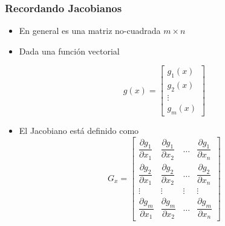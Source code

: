 \begin{frame}
    \frametitle{Recordando Jacobianos}
    
    \begin{itemize}
        \item En general es una matriz no-cuadrada $m \times n$
        \item Dada una función vectorial
        
        \begin{equation*}
            g(x) =
            \begin{bmatrix}
            g_{1}(x) \\
            g_{2}(x) \\
            \vdots \\
            g_{m}(x)
            \end{bmatrix}
        \end{equation*}
    
        \item  El Jacobiano está definido como
        \begin{equation*}
        G_{x} =
        \begin{bmatrix}
            \dfrac{\partial g_{1}}{\partial x_{1}} & \dfrac{\partial g_{1}}{\partial x_{2}}& \dots &  \dfrac{\partial g_{1}}{\partial x_{n}}\\
            \dfrac{\partial g_{2}}{\partial x_{1}} & \dfrac{\partial g_{2}}{\partial x_{2}}& \dots &  \dfrac{\partial g_{2}}{\partial x_{n}}\\
            \vdots & \vdots& \vdots & \vdots\\
            \dfrac{\partial g_{m}}{\partial x_{1}} & \dfrac{\partial g_{m}}{\partial x_{2}}& \dots &  \dfrac{\partial g_{m}}{\partial x_{n}}
        \end{bmatrix}
        \end{equation*}        
    \end{itemize}
\end{frame}

